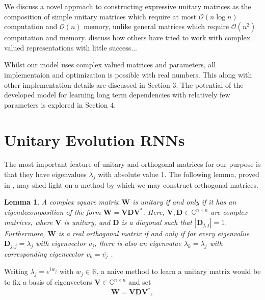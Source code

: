 \documentclass{article} %
\newcommand{\matr}[1]{\mathbf{#1}}
\newcommand\RR{\mathbb{R}}
\newtheorem{lemma}{Lemma}
\begin{document}
We discuss a novel approach to constructing expressive unitary matrices as the composition of simple
unitary matrices which require at most $\mathcal{O}(n \log n)$ computation and $\mathcal{O}(n)$ memory,
unlike general matrices which require $\mathcal{O}(n^2)$ computation and memory. {\color{red} discuss how 
others have tried to work with complex valued representations with little success... }

Whilst our model uses complex valued matrices and parameters, all implementaion and optimization is 
possible with real numbers. This along with other implementation details are discussed in Section 3.
The potential of the developed model for learning long term dependencies with relatively few parameters is
explored in Section 4.



%
%
%
%
%

\section{Unitary Evolution RNNs}

The most important feature of unitary and orthogonal matrices for our purpose is that they have eigenvalues
$\lambda_j$ with absolute value 1. The following lemma, proved in \cite{linalgbook}, may shed light on a 
method by which we may construct orthogonal matrices.

\begin{lemma}
  A complex square matrix $\matr{W}$ is unitary if and only if it has an eigendecomposition of the form
  $\matr{W} = \matr{V} \matr{D} \matr{V}^*$. Here, $\matr{V}, \matr{D} \in \mathbb{C}^{n \times n}$ are
  complex matrices, where $\matr{V}$ is unitary, and $\matr{D}$ is a diagonal such that $|\matr{D}_{j,j}|=1$. 
  Furthermore, $\matr{W}$ is a real orthogonal matrix if and only if for every eigenvalue $\matr{D}_{j,j} 
  = \lambda_j$ with eigenvector $v_j$, there is also an eigenvalue $\lambda_k = \overline{\lambda_j}$ with 
  corresponding eigenvector $v_k = \overline{v_j}$ .
\label{lemma}
\end{lemma}

Writing $\lambda_j = e^{i w_j}$ with $w_j \in \RR$, a naive method to learn a unitary matrix would be to
fix a basis of eigenvectors $\matr{V} \in \mathbb{C}^{n \times n}$ and set
\begin{equation} \matr{W} = \matr{V} \matr{D} \matr{V}^{*} , \end{equation}
\end{document}
